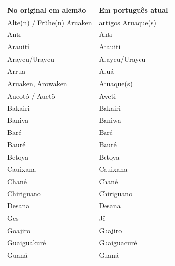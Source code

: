 \begin{table}[ht!]
\begin{center}
\begin{tabular}{ll}
\textbf{No original em alemão} & \textbf{Em português atual} \\
Alte(n) / Frühe(n) Aruaken     & antigos Aruaque(s)          \\
Anti                           & Anti       				\\                
Arauití & Arauiti \\ 
Araycu/Uraycu & Araycu/Uraycu \\ 
Arrua & Aruá \\ 
Aruaken, Arowaken & Aruaque(s) \\ 
Aueotó / Auetö & Aweti \\ 
Bakairi & Bakairi \\ 
Baniva & Baniwa \\ 
Baré & Baré \\ 
Bauré & Bauré \\ 
Betoya & Betoya \\ 
Cauixana & Cauixana \\ 
Chané & Chané \\ 
Chiriguano & Chiriguano \\ 
Desana & Desana \\ 
Ges & Jê \\ 
Goajiro & Guajiro \\ 
Guaiguakuré & Guaiguacuré \\ 
Guaná & Guaná \\ 
\end{tabular}
\end{center}
\end{table}

